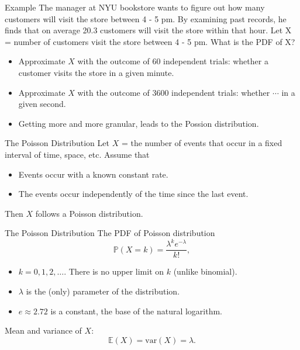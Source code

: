 \documentclass{beamer}
\newcommand{\pr}{\mathbb{P}}
\newcommand{\var}{\text{var}}
\newcommand{\E}{\mathbb{E}}
\begin{document}
\begin{frame}{Example}
\small
The manager at NYU bookstore wants to figure out how many customers will visit the store between 4 - 5 pm.
By examining past records, he finds that on average 20.3 customers will visit the store within that hour.
Let X = number of customers visit the store between 4 - 5 pm. What is the PDF of X? 
\begin{itemize}
\small
\item Approximate $X$ with the outcome of 60 independent trials: whether a customer visits the store in a given minute. 
\item Approximate $X$ with the outcome of 3600 independent trials:  whether $\cdots$ in a given second. 
\item Getting more and more granular, leads to the \alert{Possion distribution}.
\end{itemize}
\normalsize
\end{frame}


\begin{frame}{The Poisson Distribution}
Let $X$ = the number of events that occur in a fixed interval of time, space, etc.  Assume that
\begin{itemize}
\item Events occur with a known constant rate.
\item The events occur independently of the time since the last event.
\end{itemize}

Then $X$ follows a \alert{Poisson distribution}.
\end{frame}

\begin{frame}{The Poisson Distribution}
The PDF of Poisson distribution
$$
\pr(X=k)=\frac{\lambda^k e^{-\lambda}}{k!},
$$
\begin{itemize}
\item $k=0,1,2,\dots$. There is no upper limit on $k$ (unlike binomial).
\item $\lambda$ is the (only) parameter of the distribution.
\item $e\approx 2.72$ is a constant, the base of the natural logarithm.
\end{itemize}

Mean and variance of $X$: 
$$ \E(X)=\var(X)=\lambda.$$
\end{frame}
\end{document}
